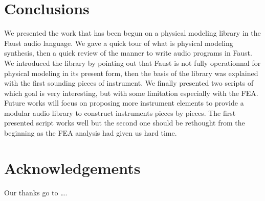 \documentclass[11pt,a4paper]{article}
\begin{document}
\section{Conclusions}

We presented the work that has been begun on a physical modeling library in the Faust audio language. We gave a quick tour of what is physical modeling synthesis, then a quick review of the manner to write audio programs in Faust. We introduced the library by pointing out that Faust is not fully operationnal for physical modeling in its present form, then the basis of the library was explained with the first sounding pieces of instrument. We finally presented two scripts of which goal is very interesting, but with some limitation especially with the FEA.\\

Future works will focus on proposing more instrument elements to provide a modular audio library to construct instruments pieces by pieces. The first presented script works well but the second one should be rethought from the beginning as the FEA analysis had given us hard time.

\section{Acknowledgements}

Our thanks go to \ldots .



\end{document}
